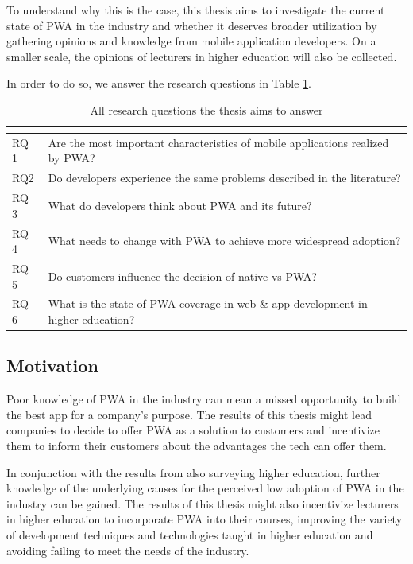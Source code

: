 \documentclass[a4paper,12pt]{article}
\begin{document}
To understand why this is the case, this thesis aims to investigate the current state of PWA in the industry and whether it deserves broader utilization by gathering opinions and knowledge from mobile application developers. On a smaller scale, the opinions of lecturers in higher education will also be collected.

In order to do so, we answer the research questions in Table \ref{tab:rqs}.

\begin{table}[t]
\centering
{}
\begin{tabular}{|l|p{12.5cm}|}
\hline
\multicolumn{2}{|c|}{\cellcolor[HTML]{343434}{\color[HTML]{FFFFFF} Research questions}} \\ \hline
RQ 1 & Are the most important characteristics of mobile applications realized by PWA? \\
RQ2 & Do developers experience the same problems described in the literature? \\
RQ 3 & What do developers think about PWA and its future? \\
RQ 4 & What needs to change with PWA to achieve more widespread adoption? \\
RQ 5 & Do customers influence the decision of native vs PWA? \\
RQ 6 & What is the state of PWA coverage in web \& app development in higher education? \\ \hline
\end{tabular}
\caption{All research questions the thesis aims to answer}
\label{tab:rqs}
\end{table}

\newpage
\subsection{Motivation}
\label{Intro_motivation}
Poor knowledge of PWA in the industry can mean a missed opportunity to build the best app for a company’s purpose. The results of this thesis might lead companies to decide to offer PWA as a solution to customers and incentivize them to inform their customers about the advantages the tech can offer them.

In conjunction with the results from also surveying higher education, further knowledge of the underlying causes for the perceived low adoption of PWA in the industry can be gained. The results of this thesis might also incentivize lecturers in higher education to incorporate PWA into their courses, improving the variety of development techniques and technologies taught in higher education and avoiding failing to meet the needs of the industry.
\end{document}
